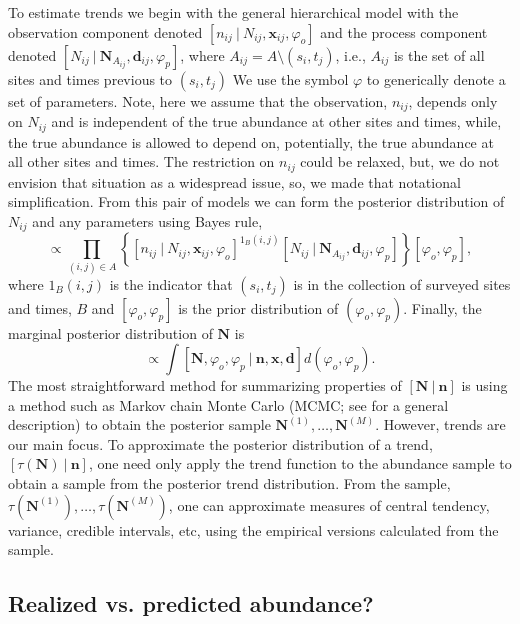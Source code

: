 \documentclass[12pt,letter,draft]{article}
\newcommand{\Nij}{\ensuremath{N_{ij}}}
\newcommand{\nij}{\ensuremath{n_{ij}}}
\newcommand{\dij}{\ensuremath{\mathbf{d}_{ij}}}
\newcommand{\xij}{\ensuremath{\mathbf{x}_{ij}}}
\begin{document}
To estimate trends we begin with the general hierarchical model with the observation component denoted $[n_{ij}\ |\ \Nij,\xij, \varphi_o]$ and the process component denoted $[\Nij\ |\ \mathbf{N}_{A_{ij}},\dij,\varphi_p]$, where $A_{ij} = A\setminus (s_i,t_j)$, i.e., $A_{ij}$ is the set of all sites and times previous to $(s_i,t_j)$ We use the symbol $\varphi$ to generically denote a set of parameters. Note, here we assume that the observation, $\nij$, depends only on $\Nij$ and is independent of the true abundance at other sites and times, while, the true abundance is allowed to depend on, potentially, the true abundance at all other sites and times. The restriction on $\nij$ could be relaxed, but, we do not envision that situation as a widespread issue, so, we made that notational simplification. From this pair of models we can form the posterior distribution of $\Nij$ and any parameters using Bayes rule,
\begin{equation}
[\mathbf{N}, \varphi_o, \varphi_p\ |\ \mathbf{n}, \mathbf{x}, \mathbf{d}] \propto \prod_{(i,j)\in A}\left\{[n_{ij}\ |\ \Nij,\xij, \varphi_o]^{1_B(i,j)} [\Nij\ |\ \mathbf{N}_{A_{ij}}, \dij, \varphi_p]\right\}[\varphi_o, \varphi_p],
\end{equation}
where $1_B(i,j)$ is the indicator that $(s_i,t_j)$ is in the collection of surveyed sites and times, $B$ and $[\varphi_o, \varphi_p]$ is the prior distribution of $(\varphi_o, \varphi_p)$. Finally, the marginal posterior distribution of $\mathbf{N}$ is 
\begin{equation}
[\mathbf{N}|\mathbf{n}] \propto \int [\mathbf{N}, \varphi_o, \varphi_p\ |\ \mathbf{n}, \mathbf{x}, \mathbf{d}]d(\varphi_o,\varphi_p).\end{equation}
The most straightforward method for summarizing properties of $[\mathbf{N}\ |\ \mathbf{n}]$ is using a method such as Markov chain Monte Carlo (MCMC; see \citealt{Givens:2005dy} for a general description) to obtain the posterior sample $\mathbf{N}^{(1)},\dots,\mathbf{N}^{(M)}$.  However, trends are our main focus. To approximate the posterior distribution of a trend, $[\tau(\mathbf{N})\ |\ \mathbf{n}]$, one need only apply the trend function to the abundance sample to obtain a sample from the posterior trend distribution. From the sample, $\tau(\mathbf{N}^{(1)}),\dots,\tau(\mathbf{N}^{(M)})$, one can approximate measures of central tendency, variance, credible intervals, etc, using the empirical versions calculated from the sample.



\subsection{Realized vs. predicted abundance?}
\end{document}
